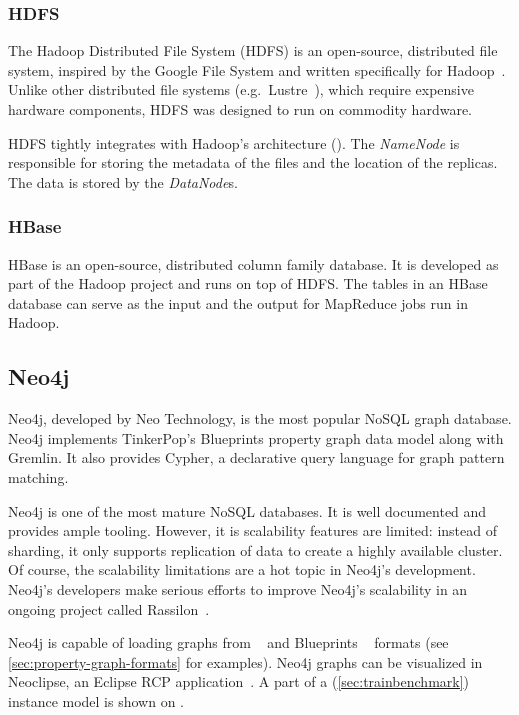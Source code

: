 \subsubsection{HDFS}

The Hadoop Distributed File System (HDFS) is an open-source, distributed file system, inspired by the Google File System and written specifically for Hadoop~\cite{Hadoop}. Unlike other distributed file systems (e.g.\ Lustre~\cite{Lustre}), which require expensive hardware components, HDFS was designed to run on commodity hardware.

HDFS tightly integrates with Hadoop's architecture (). The \emph{NameNode} is responsible for storing the metadata of the files and the location of the replicas. The data is stored by the \emph{DataNode}s.


\subsubsection{HBase}

HBase is an open-source, distributed column family database. It is developed as part of the Hadoop project and runs on top of HDFS. The tables in an HBase database can serve as the input and the output for MapReduce jobs run in Hadoop.

\subsection{Neo4j}
\label{subsec:neo4j}

Neo4j, developed by Neo Technology, is the most popular NoSQL graph database. Neo4j implements TinkerPop's Blueprints property graph data model along with Gremlin. It also provides Cypher, a declarative query language for graph pattern matching. 

Neo4j is one of the most mature NoSQL databases. It is well documented and provides ample tooling. However, it is scalability features are limited: instead of sharding, it only supports replication of data to create a highly available cluster. Of course, the scalability limitations are a hot topic in Neo4j's development. Neo4j's developers make serious efforts to improve Neo4j's scalability in an ongoing project called Rassilon~\cite{rassilon}.

Neo4j is capable of loading graphs from \graphml{}~\cite{GraphML} and Blueprints \graphson{}~\cite{BlueprintsGraphSON} formats (see \autoref{sec:property-graph-formats} for examples). Neo4j graphs can be visualized in Neoclipse, an Eclipse RCP application~\cite{Neoclipse}. A part of a \tb{} (\autoref{sec:trainbenchmark}) instance model is shown on .

